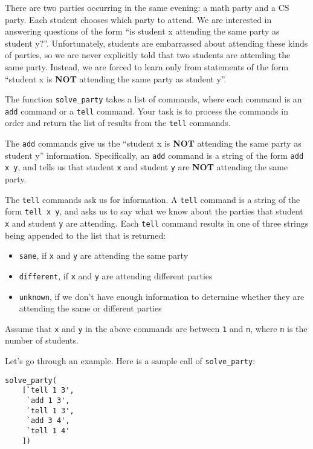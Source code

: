 \documentclass{assignment-263}
\begin{document}
\begin{enumerate}
There are two parties occurring in the same evening: a math party and a CS party.
Each student chooses which party to attend. We are interested in answering questions of the form ``is student x attending the same party as student y?''. Unfortunately, students are embarrassed about attending these kinds of parties, so we are never explicitly told that two students are attending the same party. Instead, we are forced to learn only from statements of the form 
``student x is {\bf NOT} attending the same party as student y''.

The function \verb|solve_party| takes a list of commands, where each command is an \verb|add| command or a \verb|tell| command. Your task is to process the commands in order and return the list of results from the \verb|tell| commands.

The \verb|add| commands give us the ``student x is {\bf NOT} attending the same party as student y'' information. Specifically, an \verb|add| command is a string of the form \verb|add x y|, and tells us that student \verb|x| and student \verb|y| are {\bf NOT} attending the same party.

The \verb|tell| commands ask us for information. A \verb|tell| command is a string of the form \verb|tell x y|, and asks us to say what we know about the parties that student \verb|x| and student \verb|y| are attending. Each \verb|tell| command results in one of three strings being appended to the list that is returned:
\begin{itemize}
\item \verb|same|, if \verb|x| and \verb|y| are attending the same party
\item \verb|different|, if \verb|x| and \verb|y| are attending different parties
\item \verb|unknown|, if we don't have enough information to determine whether they are attending the same or different parties
\end{itemize}

Assume that \verb|x| and \verb|y| in the above commands are between \verb|1| and \verb|n|, where \verb|n| is the number of students.

Let's go through an example. Here is a sample call of \verb|solve_party|:

\begin{verbatim}
solve_party(
    [`tell 1 3',
     `add 1 3',
     `tell 1 3',
     `add 3 4',
     `tell 1 4'
    ])
\end{verbatim}


\end{enumerate}
\end{document}

